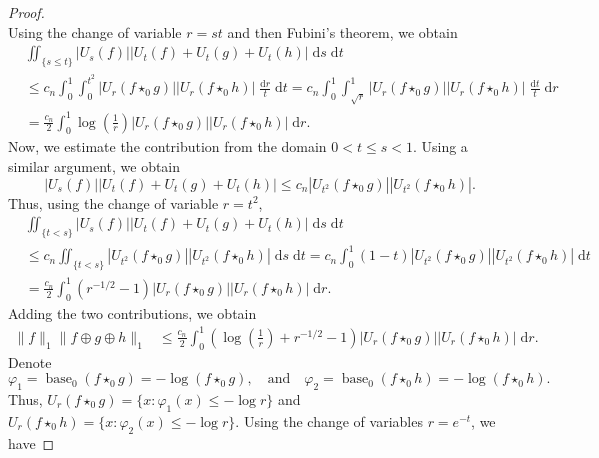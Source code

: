 \documentclass[11pt]{amsart}
\theoremstyle{plain}
\theoremstyle{definition}
\theoremstyle{remark}
\begin{document}
\begin{proof}
\[        \]
        Using the change of variable $r = st$ and then Fubini's theorem, we obtain
        \begin{align}
        &\iint_{\{s\leq t\}} |U_s (f)  | |U_t (f) + U_t (g)  + U_t (h) | \;\mathrm ds \;\mathrm dt
        \\
        &\leq c_n \int_0^1 \int_{0}^{t^2} |U_{r}(f \star_0 g) | | U_{r}(f \star_0 h)| \;\frac{\mathrm dr}{t} \;\mathrm dt
        = c_n  \int_{0}^{1} \int_{\sqrt{r}}^1 |U_{r}(f \star_0 g) | | U_{r}(f \star_0 h)|  \;\frac{\mathrm dt}{t} \;\mathrm dr
        \\
        &=\frac{c_n}{2} \int_0^1 \log \left(\frac{1}{r}\right)|U_{r}(f \star_0 g) | | U_{r}(f \star_0 h)|  \;\mathrm dr. \label{eq:first-con}
        \end{align}
        Now, we estimate the contribution from the domain $0<t \leq s <1$. Using a similar argument, we obtain
        \[
            |U_s (f)  | |U_t (f) + U_t (g)  + U_t (h) |  \leq c_n |U_{t^2}(f \star_0 g) | | U_{t^2}(f \star_0 h)|.
        \]
        Thus, using the change of variable $r = t^2$,
        \begin{align}
            &\iint_{\{t < s\}} |U_s (f)  | |U_t (f) + U_t (g)  + U_t (h) | \;\mathrm ds \;\mathrm dt
            \\
            &\leq c_n \iint_{\{ t<s\}}  |U_{t^2}(f \star_0 g) | | U_{t^2}(f \star_0 h)| \;\mathrm ds \;\mathrm dt
            =  c_n \int_{0}^1 (1-t) |U_{t^2}(f \star_0 g) | | U_{t^2}(f \star_0 h)|  \;\mathrm dt
            \\
            &= \frac{c_n}{2} \int_0^1\left(r^{-1 / 2}-1\right) |U_{r}(f \star_0 g) | | U_{r}(f \star_0 h)|  \;\mathrm dr. \label{eq:second-con}
        \end{align}
        Adding the two contributions, we obtain
        \begin{align}
            \|f\|_1 \|f \oplus g \oplus h\|_1
            & \leq \frac{c_n}{2} \int_0^1\left(\log \left(\frac{1}{r}\right)+r^{-1 / 2}-1\right)\left|U_r\left(f \star_0 g\right)\right|\left|U_r\left(f \star_0 h\right)\right|\;\mathrm  d r.
        \end{align}
        Denote
        \[
            \varphi_1 = \operatorname{base}_0 (f \star_0 g) = -\log ( f \star_0 g), \quad \text{and} \quad \varphi_2 = \operatorname{base}_0 (f \star_0 h)= -\log ( f \star_0 h).
        \]
        Thus, $U_r(f \star_0 g) = \{x : \varphi_1 (x) \leq -\log r \}$ and $U_r(f \star_0 h) = \{x : \varphi_2 (x) \leq -\log r \}.$ Using the change of variables $ r = e^{-t}$, we have

\end{proof}
\end{document}
